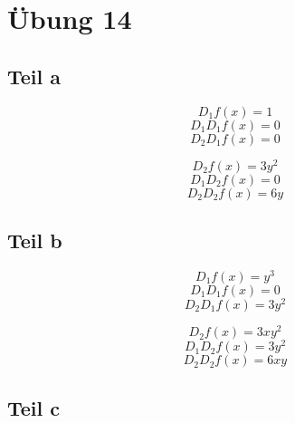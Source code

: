 \documentclass[10pt,a4paper]{article}
\begin{document}
\section*{Übung 14}

\subsection*{Teil a}

\begin{equation}
D_{1} f(x) = 1
\end{equation}
\begin{equation}
D_{1} D_{1} f(x) = 0
\end{equation}
\begin{equation}
D_{2} D_{1} f(x) = 0
\end{equation}

\begin{equation}
D_{2} f(x) = 3y^{2}
\end{equation}
\begin{equation}
D_{1} D_{2} f(x) = 0
\end{equation}
\begin{equation}
D_{2} D_{2} f(x) = 6y
\end{equation}

\subsection*{Teil b}

\begin{equation}
D_{1} f(x) = y^{3}
\end{equation}
\begin{equation}
D_{1} D_{1} f(x) = 0 
\end{equation}
\begin{equation}
D_{2} D_{1} f(x) = 3y^{2}
\end{equation}

\begin{equation}
D_{2} f(x) = 3xy^{2}
\end{equation}
\begin{equation}
D_{1} D_{2} f(x) = 3y^{2}
\end{equation}
\begin{equation}
D_{2} D_{2} f(x) = 6xy
\end{equation}

\subsection*{Teil c}
\end{document}
